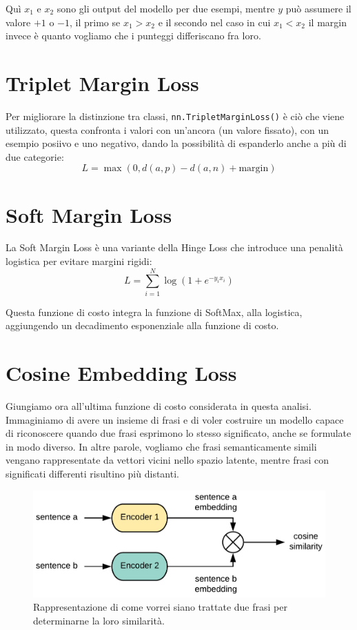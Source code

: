 Quì $x_1$ e $x_2$ sono gli output del modello per due esempi, mentre $y$ può assumere il valore $+1$ o $-1$, il primo se $x_1 > x_2$ e il secondo nel caso in cui $x_1 < x_2$ il margin invece è quanto vogliamo che i punteggi differiscano fra loro.

\section{Triplet Margin Loss}
Per migliorare la distinzione tra classi, \texttt{nn.TripletMarginLoss()} è ciò che viene utilizzato, questa confronta i valori con un'ancora (un valore fissato), con un esempio posiivo e uno negativo, dando la possibilità di espanderlo anche a più di due categorie:
\begin{equation}
L = \max(0, d(a, p) - d(a, n) + \text{margin})
\end{equation}

\section{Soft Margin Loss}
La Soft Margin Loss è una variante della Hinge Loss che introduce una penalità logistica per evitare margini rigidi:
\begin{equation}
L = \sum_{i=1}^{N} \log(1 + e^{-y_i x_i})
\end{equation}

Questa funzione di costo integra la funzione di SoftMax, alla logistica, aggiungendo un decadimento esponenziale alla funzione di costo.

\section{Cosine Embedding Loss}
Giungiamo ora all'ultima funzione di costo considerata in questa analisi. Immaginiamo di avere un insieme di frasi e di voler costruire un modello capace di riconoscere quando due frasi esprimono lo stesso significato, anche se formulate in modo diverso. In altre parole, vogliamo che frasi semanticamente simili vengano rappresentate da vettori vicini nello spazio latente, mentre frasi con significati differenti risultino più distanti.
\begin{figure}[h]
    \centering
    \includegraphics[width=0.75\linewidth]{figure/CosineSim.png}
    \caption{Rappresentazione di come vorrei siano trattate due frasi per determinarne la loro similarità.}
    \label{fig:coSim}
\end{figure}


